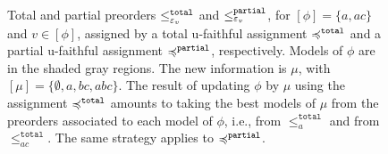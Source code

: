 \begin{figure}
	\caption{
		Total and partial preorders 
		$\le^{\mathtt{total}}_{\varepsilon_{v}}$ 
		and
		$\le^{\mathtt{partial}}_{\varepsilon_{v}}$,
		for $[\phi]=\{a,ac\}$
		and $v\in[\phi]$,
		assigned by a total u-faithful assignment $\preccurlyeq^{\mathtt{total}}$
		and a partial u-faithful assignment $\preccurlyeq^{\mathtt{partial}}$,
		respectively.
		Models of $\phi$ are in the shaded gray regions.
		The new information is $\mu$,
		with $[\mu]=\{\emptyset,a,bc,abc\}$.
		The result of updating $\phi$ by $\mu$
		using the assignment $\preccurlyeq^{\mathtt{total}}$ amounts to taking
		the best models of $\mu$ from the preorders associated to 
		each model of $\phi$,
		i.e., from $\le^{\mathtt{total}}_{a}$ and from 
		$\le^{\mathtt{total}}_{ac}$.
		The same strategy applies to $\preccurlyeq^{\mathtt{partial}}$.
	}
	\label{fig:3-update-preorder-operator-interplay}
\end{figure}	

